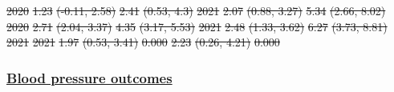 \documentclass[
  letterpaper,
  DIV=11,
  numbers=noendperiod]{scrartcl}
\providecommand{\DIFadd}[1]{{\protect\color{blue}\underline{#1}}} %
\providecommand{\DIFdel}[1]{{\protect\color{red}\sout{#1}}}                      %
\providecommand{\DIFaddbegin}{} %
\providecommand{\DIFaddend}{} %
\providecommand{\DIFdelbegin}{} %
\providecommand{\DIFdelend}{} %
\providecommand{\DIFdelFL}[1]{\DIFdel{#1}} %
\newcommand{\DIFscaledelfig}{0.5}
\newlength{\DIFdelgraphicswidth} %
\newlength{\DIFdelgraphicsheight} %
\newcommand{\DIFaddincludegraphics}[2][]{{\color{blue}\fbox{\DIFOincludegraphics[#1]{#2}}}} %
\newcommand{\DIFdelincludegraphics}[2][]{%
\sbox{\DIFdelgraphicsbox}{\DIFOincludegraphics[#1]{#2}}%
\settoboxwidth{\DIFdelgraphicswidth}{\DIFdelgraphicsbox} %
\settoboxtotalheight{\DIFdelgraphicsheight}{\DIFdelgraphicsbox} %
\scalebox{\DIFscaledelfig}{%
\parbox[b]{\DIFdelgraphicswidth}{\usebox{\DIFdelgraphicsbox}\\[-\baselineskip] \rule{\DIFdelgraphicswidth}{0em}}\llap{\resizebox{\DIFdelgraphicswidth}{\DIFdelgraphicsheight}{%
\setlength{\unitlength}{\DIFdelgraphicswidth}%
\begin{picture}(1,1)%
\thicklines\linethickness{2pt} %
{\color[rgb]{1,0,0}\put(0,0){\framebox(1,1){}}}%
{\color[rgb]{1,0,0}\put(0,0){\line( 1,1){1}}}%
{\color[rgb]{1,0,0}\put(0,1){\line(1,-1){1}}}%
\end{picture}%
}\hspace*{3pt}}} %
} %
\DeclareRobustCommand{\DIFaddbegin}{\DIFOaddbegin \let\includegraphics\DIFaddincludegraphics} %
\DeclareRobustCommand{\DIFaddend}{\DIFOaddend \let\includegraphics\DIFOincludegraphics} %
\DeclareRobustCommand{\DIFdelbegin}{\DIFOdelbegin \let\includegraphics\DIFdelincludegraphics} %
\DeclareRobustCommand{\DIFdelend}{\DIFOaddend \let\includegraphics\DIFOincludegraphics} %
\begin{document}
\DIFdelFL{2020 }%
\DIFdelFL{1.23 }%
\DIFdelFL{(-0.11, 2.58) }%
\DIFdelFL{2.41 }%
\DIFdelFL{(0.53, 4.3) }%
\DIFdelFL{2021 }%
\DIFdelFL{2.07 }%
\DIFdelFL{(0.88, 3.27) }%
\DIFdelFL{5.34 }%
\DIFdelFL{(2.66, 8.02) }%
\DIFdelFL{2020 }%
\DIFdelFL{2.71 }%
\DIFdelFL{(2.04, 3.37) }%
\DIFdelFL{4.35 }%
\DIFdelFL{(3.17, 5.53) }%
\DIFdelFL{2021 }%
\DIFdelFL{2.48 }%
\DIFdelFL{(1.33, 3.62) }%
\DIFdelFL{6.27 }%
\DIFdelFL{(3.73, 8.81) }%
\DIFdelFL{\hspace{1em}2021 }%
\DIFdelFL{2021 }%
\DIFdelFL{1.97 }%
\DIFdelFL{(0.53, 3.41) }%
\DIFdelFL{0.000 }%
\DIFdelFL{2.23 }%
\DIFdelFL{(0.26, 4.21) }%
\DIFdelFL{0.000}%

\DIFdelend \newpage

\DIFdelbegin %
\DIFdelend \DIFaddbegin \subsubsection{\DIFadd{Blood pressure outcomes}}\label{blood-pressure-outcomes}
\DIFaddend 
\end{document}
